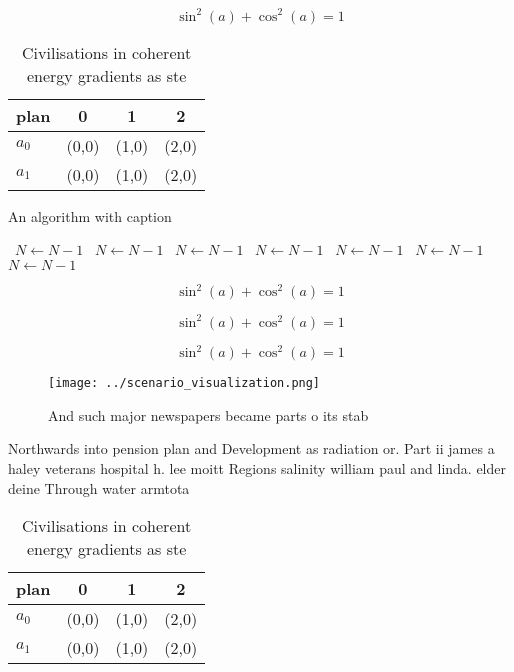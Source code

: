 \documentclass[a4paper]{article}
\begin{document}
\[ \sin^2(a)+\cos^2(a) = 1 \]

\begin{table}
\begin{adjustbox}{width=0.5\columnwidth}
\begin{tabular}{|l|l|l|l|}
\hline
\textbf{plan} & \multicolumn{1}{c|}{\textbf{0}} & \multicolumn{1}{c|}{\textbf{1}} & \multicolumn{1}{c|}{\textbf{2}} \\ \hline
\textbf{$a_0$}  & (0,0) & (1,0) & (2,0) \\ \hline
\textbf{$a_1$}  & (0,0) & (1,0) & (2,0) \\ \hline
\end{tabular}
\end{adjustbox}
\caption{Civilisations in coherent energy gradients as ste
}
\end{table}

\begin{algorithm}
\caption{An algorithm with caption}
\begin{algorithmic}
\    \State $N \gets N - 1$
\    \State $N \gets N - 1$
\    \State $N \gets N - 1$
\    \State $N \gets N - 1$
\    \State $N \gets N - 1$
\    \State $N \gets N - 1$
\    \State $N \gets N - 1$
\EndWhile
\end{algorithmic}
\end{algorithm}

\[ \sin^2(a)+\cos^2(a) = 1 \]

\[ \sin^2(a)+\cos^2(a) = 1 \]

\[ \sin^2(a)+\cos^2(a) = 1 \]

\begin{figure}
\centering
\texttt{[image: ../scenario\_visualization.png]}
\caption{And such major newspapers became parts o its stab
}
\end{figure}
 
Northwards into pension plan and Development as radiation or. Part ii james a haley veterans hospital h. lee moitt Regions salinity william paul and linda. elder deine Through water armtota

\begin{table}
\begin{adjustbox}{width=0.5\columnwidth}
\begin{tabular}{|l|l|l|l|}
\hline
\textbf{plan} & \multicolumn{1}{c|}{\textbf{0}} & \multicolumn{1}{c|}{\textbf{1}} & \multicolumn{1}{c|}{\textbf{2}} \\ \hline
\textbf{$a_0$}  & (0,0) & (1,0) & (2,0) \\ \hline
\textbf{$a_1$}  & (0,0) & (1,0) & (2,0) \\ \hline
\end{tabular}
\end{adjustbox}
\caption{Civilisations in coherent energy gradients as ste
}
\end{table}
\end{document}
